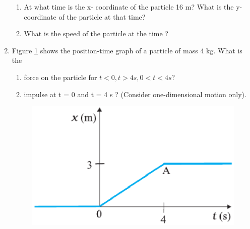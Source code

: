 \begin{enumerate}[label=\arabic*.,ref=\thesubsection.\theenumi]
\begin{enumerate}
\item  At what time is
the x- coordinate of the particle 16 m? What is the y-coordinate of the particle at that time? 
\item  What is the speed of the particle at the time ?
\end{enumerate}
\item Figure \ref{fig:5.16} shows the position-time graph of a particle of mass 4 kg. What is the 
\begin{enumerate}
\item  force on the particle for $t < 0, t > 4 s, 0 < t < 4 s$? 
\item  impulse at t = 0 and t = 4 s ? (Consider one-dimensional motion only).
\end{enumerate}
\begin{figure}[!ht]
\centering
\includegraphics[width=\columnwidth]{./figs/11-1/5/5.16.eps}
\caption{}
\label{fig:5.16}
\end{figure}

\end{enumerate}
